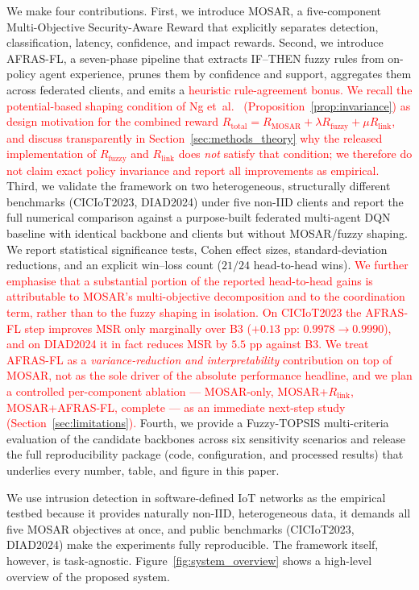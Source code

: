 \documentclass[journal]{IEEEtran}
\newcommand{\rev}[1]{\textcolor{red}{#1}}
\begin{document}
We make four contributions. First, we introduce MOSAR, a five-component
Multi-Objective Security-Aware Reward that explicitly separates detection,
classification, latency, confidence, and impact rewards. Second, we
introduce AFRAS-FL, a seven-phase pipeline that extracts IF--THEN fuzzy
rules from on-policy agent experience, prunes them by confidence and
support, aggregates them across federated clients, and emits a
\rev{heuristic rule-agreement bonus.} \rev{We recall the potential-based shaping condition of Ng et~al.~\cite{ng1999policy_invariance} (Proposition~\ref{prop:invariance}) as design motivation for the combined reward
$R_{\text{total}} = R_{\text{MOSAR}} + \lambda R_{\text{fuzzy}} + \mu
R_{\text{link}}$, and discuss transparently in Section~\ref{sec:methods_theory} why the released implementation of $R_{\text{fuzzy}}$ and $R_{\text{link}}$ does \emph{not} satisfy that condition; we therefore do not claim exact policy invariance and report all improvements as empirical.}
Third, we validate the framework on two heterogeneous, structurally
different benchmarks (CICIoT2023, DIAD2024) under five non-IID clients
and report the full numerical comparison against a purpose-built
federated multi-agent DQN baseline with identical backbone and clients
but without MOSAR/fuzzy shaping. We report statistical significance
tests, Cohen effect sizes, standard-deviation reductions, and an
explicit win--loss count ($21/24$ head-to-head wins). \rev{We further emphasise that a substantial portion of the reported head-to-head gains is attributable to MOSAR's multi-objective decomposition and to the coordination term, rather than to the fuzzy shaping in isolation. On CICIoT2023 the AFRAS-FL step improves MSR only marginally over B3 ($+0.13$ pp: $0.9978 \to 0.9990$), and on DIAD2024 it in fact reduces MSR by $5.5$ pp against B3. We treat AFRAS-FL as a \emph{variance-reduction and interpretability} contribution on top of MOSAR, not as the sole driver of the absolute performance headline, and we plan a controlled per-component ablation --- MOSAR-only, MOSAR+$R_{\text{link}}$, MOSAR+AFRAS-FL, complete --- as an immediate next-step study (Section~\ref{sec:limitations}).} Fourth, we provide
a Fuzzy-TOPSIS multi-criteria evaluation of the candidate backbones
across six sensitivity scenarios and release the full reproducibility
package (code, configuration, and processed results) that underlies
every number, table, and figure in this paper.

We use intrusion detection in software-defined IoT networks as the
empirical testbed because it provides naturally non-IID, heterogeneous
data, it demands all five MOSAR objectives at once, and public benchmarks
(CICIoT2023\cite{ciciot2023}, DIAD2024\cite{diad2024}) make the
experiments fully reproducible. The framework itself, however, is
task-agnostic. Figure~\ref{fig:system_overview} shows a high-level
overview of the proposed system.
\end{document}
